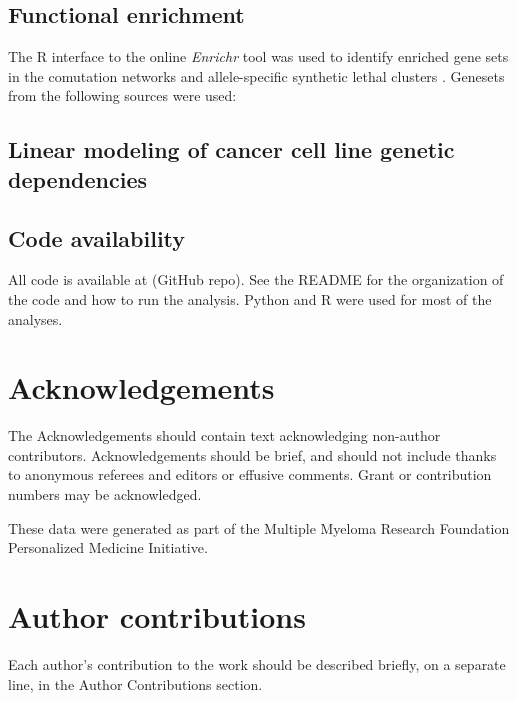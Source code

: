 \documentclass[english, 12pt, letterpaper]{article}
\begin{document}
\subsection*{Functional enrichment}
The R interface to the online \emph{Enrichr} tool was used to identify enriched gene sets in the comutation networks and allele-specific synthetic lethal clusters \cite{Chen2013, Kuleshov2016Enrichr:Update., R-enrichR}.
Genesets from the following sources were used: %

\subsection*{Linear modeling of cancer cell line genetic dependencies}





\subsection{}


\subsection*{Code availability}

All code is available at (GitHub repo).
See the README for the organization of the code and how to run the analysis.
Python \cite{van1995python} and R \cite{Rlang} were used for most of the analyses.



\section*{Acknowledgements}

The Acknowledgements should contain text acknowledging non-author contributors.
Acknowledgements should be brief, and should not include thanks to anonymous referees and editors or effusive comments.
Grant or contribution numbers may be acknowledged.

These data were generated as part of the Multiple Myeloma Research Foundation Personalized Medicine Initiative.

\section*{Author contributions}

Each author’s contribution to the work should be described briefly, on a separate line, in the Author Contributions section. 
\end{document}
